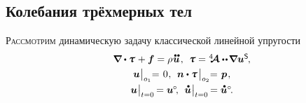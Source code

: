 

\thispagestyle{empty}

\label{chapter:vibrationsnwaves}

\begin{otherlanguage}{russian}

\section{Колебания трёхмерных тел}

\lettrine[lines=2, findent=2pt, nindent=0pt]{Р}{ассмотрим} динамическую задачу классической линейной упругости
\nopagebreak\vspace{-0.5em}\begin{equation}\label{classiclinearelasticity:problem}
\begin{array}{c}
\boldnabla \dotp \mathboldtau \hspace{0.15ex} + \bm{f} = \rho \hspace{0.1ex} \mathdotdotabove{\bm{u}} \hspace{0.2ex}, \:\:
\mathboldtau = \stiffnesstensor \dotdotp \hspace{-0.25ex} \boldnabla {\bm{u}}^{\mathsf{S}} \hspace{-0.2ex},\\[0.32em]
%
\bm{u} \hspace{0.1ex} \bigr|_{o_1} \hspace{-0.64ex} = \hspace{0.2ex} 0 \hspace{0.1ex}, \:\:
\bm{n} \dotp \mathboldtau \hspace{0.25ex} \bigr|_{o_2} \hspace{-0.64ex} = \hspace{0.2ex} \bm{p} \hspace{0.16ex},\\[0.4em]
%
\bm{u} \hspace{0.1ex} \bigr|_{t=0} \hspace{-0.2ex} = \bm{u}^{\hspace{-0.1ex}\circ} \hspace{-0.4ex}, \:\:
\mathdotabove{\bm{u}} \hspace{0.1ex} \bigr|_{t=0} \hspace{-0.2ex} = \mathdotabove{\bm{u}}^{\circ} \hspace{-0.32ex}.
\end{array}
\end{equation}


\end{otherlanguage}
